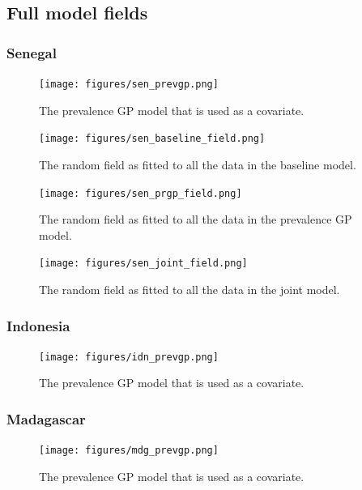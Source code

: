 \documentclass[10pt,a4]{article}
\begin{document}
\clearpage
\subsection{Full model fields}


\subsubsection{Senegal}
\begin{figure}[h!]
\centering

\texttt{[image: figures/sen\_prevgp.png]}

\caption{The prevalence GP model that is used as a covariate.}
\end{figure}



\begin{figure}[h!]
\centering

\texttt{[image: figures/sen\_baseline\_field.png]}

\caption{The random field as fitted to all the data in the baseline model.}
\end{figure}
\begin{figure}[h!]
\centering

\texttt{[image: figures/sen\_prgp\_field.png]}

\caption{The random field as fitted to all the data in the prevalence GP model.}
\end{figure}

\begin{figure}[h!]
\centering

\texttt{[image: figures/sen\_joint\_field.png]}

\caption{The random field as fitted to all the data in the joint model.}
\end{figure}




\clearpage
\subsubsection{Indonesia}
\begin{figure}[h!]
\centering

\texttt{[image: figures/idn\_prevgp.png]}

\caption{The prevalence GP model that is used as a covariate.}
\end{figure}





\clearpage
\subsubsection{Madagascar}
\begin{figure}[h!]
\centering

\texttt{[image: figures/mdg\_prevgp.png]}

\caption{The prevalence GP model that is used as a covariate.}
\end{figure}
\end{document}
